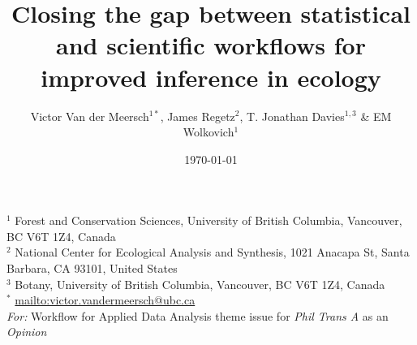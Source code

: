 \documentclass[11pt]{article}
\begin{document}
\title{Closing the gap between statistical and scientific workflows for improved inference in ecology} %
\date{\today}
\author{Victor Van der Meersch$^{1*}$, James Regetz$^{2}$, T. Jonathan Davies$^{1,3}$ \& EM Wolkovich$^{1}$}
\maketitle
\noindent $^{1}$ Forest and Conservation Sciences, University of British Columbia, Vancouver, BC V6T 1Z4, Canada\\
$^{2}$ National Center for Ecological Analysis and Synthesis, 1021 Anacapa St, Santa Barbara, CA 93101, United States\\
$^{3}$ Botany, University of British Columbia, Vancouver, BC V6T 1Z4, Canada \\
$^{*}$ \url{mailto:victor.vandermeersch@ubc.ca}\\

\noindent \emph{For:} Workflow for Applied Data Analysis theme issue for \emph{Phil Trans A} as an \emph{Opinion}
\end{document}
